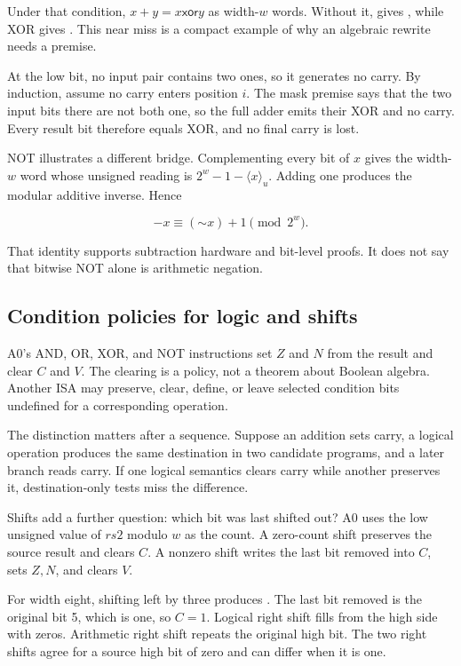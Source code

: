 Under that condition, \(x+y=x\mathbin{\mathsf{xor}}y\) as width-\(w\) words.
Without it,  gives , while XOR gives
. This near miss is a compact example of why an algebraic rewrite
needs a premise.

\begin{proofkit}[title={No common one-bit means XOR equals addition}]
At the low bit, no input pair contains two ones, so it generates no carry. By
induction, assume no carry enters position \(i\). The mask premise says that
the two input bits there are not both one, so the full adder emits their XOR
and no carry. Every result bit therefore equals XOR, and no final carry is
lost.
\end{proofkit}

NOT illustrates a different bridge. Complementing every bit of \(x\) gives
the width-\(w\) word whose unsigned reading is
\(2^w-1-\langle x\rangle_u\).
Adding one produces the modular additive inverse. Hence

\[
  -x\equiv (\mathord{\sim}x)+1\pmod{2^w}.
\]

That identity supports subtraction hardware and bit-level proofs. It does not
say that bitwise NOT alone is arithmetic negation.

\subsection{Condition policies for logic and shifts}

A0's AND, OR, XOR, and NOT instructions set \(Z\) and \(N\) from the result
and clear \(C\) and \(V\). The clearing is a policy, not a theorem about
Boolean algebra. Another ISA may preserve, clear, define, or leave selected
condition bits undefined for a corresponding operation.

The distinction matters after a sequence. Suppose an addition sets carry, a
logical operation produces the same destination in two candidate programs,
and a later branch reads carry. If one logical semantics clears carry while
another preserves it, destination-only tests miss the difference.

Shifts add a further question: which bit was last shifted out? A0 uses the low
unsigned value of \(rs2\) modulo \(w\) as the count. A zero-count shift
preserves the source result and clears \(C\). A nonzero shift writes the last
bit removed into \(C\), sets \(Z,N\), and clears \(V\).

For width eight, shifting  left by three produces
. The last bit removed is the original bit 5, which is one, so
\(C=1\). Logical right shift fills from the high side with zeros. Arithmetic
right shift repeats the original high bit. The two right shifts agree for a
source high bit of zero and can differ when it is one.

